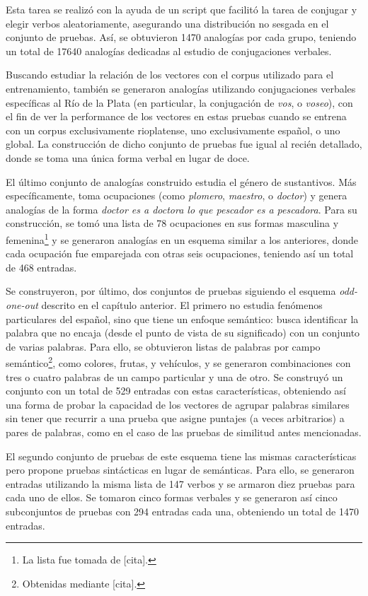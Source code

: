 Esta tarea se realizó con la ayuda de un script que facilitó la tarea de conjugar y elegir verbos
aleatoriamente, asegurando una distribución no sesgada en el conjunto de pruebas. Así, se obtuvieron
1470 analogías por cada grupo, teniendo un total de 17640 analogías dedicadas al estudio de
conjugaciones verbales.


Buscando estudiar la relación de los vectores con el corpus utilizado para el entrenamiento, también
se generaron analogías utilizando conjugaciones verbales específicas al Río de la Plata (en
particular, la conjugación de \textit{vos}, o \textit{voseo}), con el fin de ver la performance de
los vectores en estas pruebas cuando se entrena con un corpus exclusivamente rioplatense, uno
exclusivamente español, o uno global. La construcción de dicho conjunto de pruebas fue igual al
recién detallado, donde se toma una única forma verbal en lugar de doce.


El último conjunto de analogías construido estudia el género de sustantivos. Más específicamente,
toma ocupaciones (como \textit{plomero}, \textit{maestro}, o \textit{doctor}) y genera analogías de
la forma \textit{doctor es a doctora lo que pescador es a pescadora}. Para su construcción, se tomó
una lista de 78 ocupaciones en sus formas masculina y femenina\footnote{La lista fue tomada de
[cita].} y se generaron analogías en un esquema similar a los anteriores, donde cada ocupación fue
emparejada con otras seis ocupaciones, teniendo así un total de 468 entradas.


Se construyeron, por último, dos conjuntos de pruebas siguiendo el esquema \textit{odd-one-out}
descrito en el capítulo anterior. El primero no estudia fenómenos particulares del español, sino que
tiene un enfoque semántico: busca identificar la palabra que no encaja (desde el punto de vista de
su significado) con un conjunto de varias palabras. Para ello, se obtuvieron listas de palabras por
campo semántico\footnote{Obtenidas mediante [cita].}, como colores, frutas, y vehículos, y se
generaron combinaciones con tres o cuatro palabras de un campo particular y una de otro. Se
construyó un conjunto con un total de 529 entradas con estas características, obteniendo así una
forma de probar la capacidad de los vectores de agrupar palabras similares sin tener que recurrir a
una prueba que asigne puntajes (a veces arbitrarios) a pares de palabras, como en el caso de las
pruebas de similitud antes mencionadas.

El segundo conjunto de pruebas de este esquema tiene las mismas características pero propone pruebas
sintácticas en lugar de semánticas. Para ello, se generaron entradas utilizando la misma lista de
147 verbos y se armaron diez pruebas para cada uno de ellos. Se tomaron cinco formas verbales y se
generaron así cinco subconjuntos de pruebas con 294 entradas cada una, obteniendo un total de 1470
entradas.

